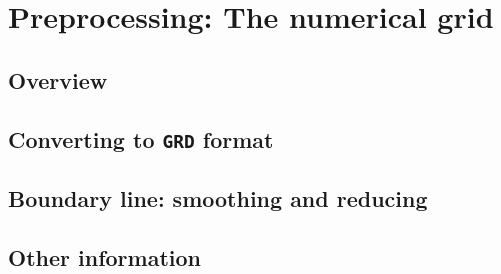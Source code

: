 \documentclass{report}
\newcommand{\todo}[1]{This section still has to be written by #1}
\begin{document}

\chapter{Preprocessing: The numerical grid}

	\section{Overview}
	

	\section{Converting to {\tt GRD} format}
	

	\section{Boundary line: smoothing and reducing}
	

	\section{Other information}
	




\end{document}
